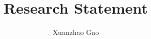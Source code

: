 \documentclass[aps,prl,reprint,showpacs,floatfix,superscriptaddress, 10pt]{revtex4-2}
\begin{document}

\title{\Large Research Statement}
\author{Xuanzhao Gao}

\maketitle








\end{document}
